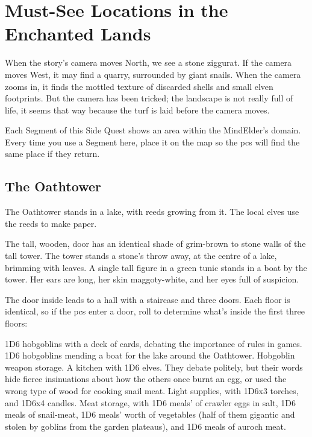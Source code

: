 \section{Must-See Locations in the Enchanted Lands}

When the story's camera moves North, we see a stone ziggurat.
If the camera moves West, it may find a quarry, surrounded by giant snails.
When the camera zooms in, it finds the mottled texture of discarded shells and small elven footprints.
But the camera has been tricked; the landscape is not really full of life, it seems that way because the turf is laid before the camera moves.

Each Segment of this Side Quest shows an area within the \gls{MindElder}'s domain.
Every time you use a Segment here, place it on the map so the \glspl{pc} will find the same place if they return.

\subsection{The Oathtower}

The Oathtower stands in a lake, with reeds growing from it.
The local elves use the reeds to make paper.

\begin{boxtext}
  The tall, wooden, door has an identical shade of grim-brown to stone walls of the tall tower.
  The tower stands a stone's throw away, at the centre of a lake, brimming with leaves.
  A single tall figure in a green tunic stands in a boat by the tower.
  Her ears are long, her skin maggoty-white, and her eyes full of suspicion.
\end{boxtext}

The door inside leads to a hall with a staircase and three doors.
Each floor is identical, so if the \glspl{pc} enter a door, roll to determine what's inside the first three floors:

\begin{dlist}
  1D6 hobgoblins with a deck of cards, debating the importance of rules in games.
  1D6 hobgoblins mending a boat for the lake around the Oathtower.
  Hobgoblin weapon storage.
  A kitchen with 1D6 elves.  They debate politely, but their words hide fierce insinuations about how the others once burnt an egg, or used the wrong type of wood for cooking snail meat.
  Light supplies, with 1D6x3 torches, and 1D6x4 candles.
  Meat storage, with 1D6 meals' of \gls{crawler} eggs in salt, 1D6 meals of snail-meat, 1D6 meals' worth of vegetables (half of them gigantic and stolen by goblins from the garden plateaus), and 1D6 meals of auroch meat.
\end{dlist}

